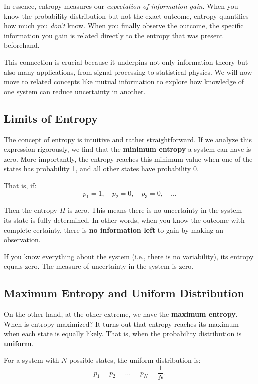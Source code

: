 \documentclass[12pt,a4paper]{article}
\newenvironment{rembox}[1][]{%
  \begin{tcolorbox}[enhanced, breakable, colback=gray!5, colframe=gray!50, title=#1, fonttitle=\bfseries, arc=3pt, boxrule=0.5pt]
}{\end{tcolorbox}}
\begin{document}
In essence, entropy measures our \emph{expectation of information gain}. When you know the probability distribution but not the exact outcome, entropy quantifies how much you \emph{don’t} know. When you finally observe the outcome, the specific information you gain is related directly to the entropy that was present beforehand.

This connection is crucial because it underpins not only information theory but also many applications, from signal processing to statistical physics. We will now move to related concepts like mutual information to explore how knowledge of one system can reduce uncertainty in another.

\subsection{Limits of Entropy}

The concept of entropy is intuitive and rather straightforward. If we analyze this expression rigorously, we find that the \textbf{minimum entropy} a system can have is zero. More importantly, the entropy reaches this minimum value when one of the states has probability 1, and all other states have probability 0.

That is, if:
\[
p_1 = 1, \quad p_2 = 0, \quad p_3 = 0, \quad \dots
\]

Then the entropy $H$ is zero. This means there is no uncertainty in the system—its state is fully determined. In other words, when you know the outcome with complete certainty, there is \textbf{no information left} to gain by making an observation.

\begin{rembox}[Interpretation of Zero Entropy]
If you know everything about the system (i.e., there is no variability), its entropy equals zero. The measure of uncertainty in the system is zero.
\end{rembox}

\subsection{Maximum Entropy and Uniform Distribution}

On the other hand, at the other extreme, we have the \textbf{maximum entropy}. When is entropy maximized? It turns out that entropy reaches its maximum when each state is equally likely. That is, when the probability distribution is \textbf{uniform}.

For a system with $N$ possible states, the uniform distribution is:
\[
p_1 = p_2 = \dots = p_N = \frac{1}{N}.
\]
\end{document}
